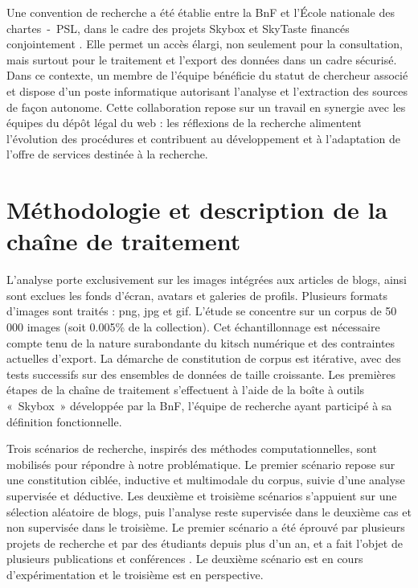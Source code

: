 \documentclass[final, fra]{anthology-ch}     %
\begin{document}
Une convention de recherche a été établie entre la BnF et l'École nationale des chartes~-~PSL, dans le cadre des projets Skybox et SkyTaste financés conjointement \cite{BERMESdeuxprojets2025}. Elle permet un accès élargi, non seulement pour la consultation, mais surtout pour le traitement et l’export des données dans un cadre sécurisé. Dans ce contexte, un membre de l’équipe bénéficie du statut de chercheur associé et dispose d’un poste informatique autorisant l’analyse et l’extraction des sources de façon autonome. Cette collaboration repose sur un travail en synergie avec les équipes du dépôt légal du web : les réflexions de la recherche alimentent l’évolution des procédures et contribuent au développement et à l’adaptation de l’offre de services destinée à la recherche.

\section{Méthodologie et description de la chaîne de traitement}
L’analyse porte exclusivement sur les images intégrées aux articles de blogs, ainsi sont exclues les fonds d’écran, avatars et galeries de profils. Plusieurs formats d’images sont traités : png, jpg et gif. L’étude se concentre sur un corpus de 50 000 images (soit 0.005\% de la collection). Cet échantillonnage est nécessaire compte tenu de la nature surabondante du kitsch numérique et des contraintes actuelles d’export. La démarche de constitution de corpus est itérative, avec des tests successifs sur des ensembles de données de taille croissante. Les premières étapes de la chaîne de traitement s’effectuent à l’aide de la boîte à outils «~Skybox~» développée par la BnF, l’équipe de recherche ayant participé à sa définition fonctionnelle.

Trois scénarios de recherche, inspirés des méthodes computationnelles, sont mobilisés pour répondre à notre problématique. Le premier scénario repose sur une constitution ciblée, inductive et multimodale du corpus, suivie d’une analyse supervisée et déductive. Les deuxième et troisième scénarios s’appuient sur une sélection aléatoire de blogs, puis l’analyse reste supervisée dans le deuxième cas et non supervisée dans le troisième. Le premier scénario a été éprouvé par plusieurs projets de recherche et par des étudiants depuis plus d’un an, et a fait l’objet de  plusieurs publications et conférences \cite{HERVIEUetudiantscoms2025, HERVIEUresaw2025, HervieuPictoria2026}. Le deuxième scénario est en cours d’expérimentation et le troisième est en perspective. 
\end{document}
